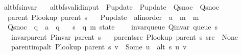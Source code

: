\begin{isabellebody}
\isanewline
{}\isamarkupfalse%
\ alt{\isacharunderscore}{\kern0pt}bfs{\isacharunderscore}{\kern0pt}invar\ {\isacharequal}{\kern0pt}\isanewline
\ \ alt{\isacharunderscore}{\kern0pt}bfs{\isacharunderscore}{\kern0pt}valid{\isacharunderscore}{\kern0pt}input\ \ P{\isacharunderscore}{\kern0pt}update\ {\isacharequal}{\kern0pt}\ P{\isacharunderscore}{\kern0pt}update\ \ Q{\isacharunderscore}{\kern0pt}snoc\ {\isacharequal}{\kern0pt}\ Q{\isacharunderscore}{\kern0pt}snoc\ {\isacharplus}{\kern0pt}\isanewline
\ \ parent\ {\isachardoublequoteopen}P{\isacharunderscore}{\kern0pt}lookup\ {\isacharparenleft}{\kern0pt}parent\ s{\isacharparenright}{\kern0pt}{\isachardoublequoteclose}\ \isanewline
\ \ P{\isacharunderscore}{\kern0pt}update\ {\isacharcolon}{\kern0pt}{\isacharcolon}{\kern0pt}\ {\isachardoublequoteopen}{\isacharprime}{\kern0pt}a{\isacharcolon}{\kern0pt}{\isacharcolon}{\kern0pt}linorder\ {\isasymRightarrow}\ {\isacharprime}{\kern0pt}a\ {\isasymRightarrow}\ {\isacharprime}{\kern0pt}m\ {\isasymRightarrow}\ {\isacharprime}{\kern0pt}m{\isachardoublequoteclose}\ \isanewline
\ \ Q{\isacharunderscore}{\kern0pt}snoc\ {\isacharcolon}{\kern0pt}{\isacharcolon}{\kern0pt}\ {\isachardoublequoteopen}{\isacharprime}{\kern0pt}q\ {\isasymRightarrow}\ {\isacharprime}{\kern0pt}a\ {\isasymRightarrow}\ {\isacharprime}{\kern0pt}q{\isachardoublequoteclose}\ \isanewline
\ \ s\ {\isacharcolon}{\kern0pt}{\isacharcolon}{\kern0pt}\ {\isachardoublequoteopen}{\isacharparenleft}{\kern0pt}{\isacharprime}{\kern0pt}q{\isacharcomma}{\kern0pt}\ {\isacharprime}{\kern0pt}m{\isacharparenright}{\kern0pt}\ state{\isachardoublequoteclose}\ {\isacharplus}{\kern0pt}\isanewline
\ \ \ invar{\isacharunderscore}{\kern0pt}queue{\isacharcolon}{\kern0pt}\ {\isachardoublequoteopen}Q{\isacharunderscore}{\kern0pt}invar\ {\isacharparenleft}{\kern0pt}queue\ s{\isacharparenright}{\kern0pt}{\isachardoublequoteclose}\isanewline
\ \ \ invar{\isacharunderscore}{\kern0pt}parent{\isacharcolon}{\kern0pt}\ {\isachardoublequoteopen}P{\isacharunderscore}{\kern0pt}invar\ {\isacharparenleft}{\kern0pt}parent\ s{\isacharparenright}{\kern0pt}{\isachardoublequoteclose}\isanewline
\ \ \ parent{\isacharunderscore}{\kern0pt}src{\isacharcolon}{\kern0pt}\ {\isachardoublequoteopen}P{\isacharunderscore}{\kern0pt}lookup\ {\isacharparenleft}{\kern0pt}parent\ s{\isacharparenright}{\kern0pt}\ src\ {\isacharequal}{\kern0pt}\ None{\isachardoublequoteclose}\isanewline
\ \ \ parent{\isacharunderscore}{\kern0pt}imp{\isacharunderscore}{\kern0pt}alt{\isacharcolon}{\kern0pt}\ {\isachardoublequoteopen}P{\isacharunderscore}{\kern0pt}lookup\ {\isacharparenleft}{\kern0pt}parent\ s{\isacharparenright}{\kern0pt}\ v\ {\isacharequal}{\kern0pt}\ Some\ u\ {\isasymLongrightarrow}\ alt\ s\ u\ v{\isachardoublequoteclose}\isanewline

\end{isabellebody}
